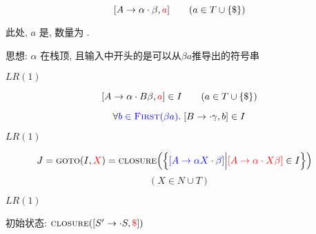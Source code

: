 \begin{frame}{}
  \begin{center}
    \begin{definition}[$LR(1)$项 (Item)]
      \[
        [A \to \alpha \cdot \beta, \textcolor{red}{a}] \qquad (a \in T \cup \{\$\})
      \]

      此处, $a$ 是, 数量为 .
    \end{definition}

    \pause
    \vspace{0.80cm}
    思想: $\alpha$ 在栈顶, 且输入中开头的是可以从$\beta a$推导出的符号串
  \end{center}
\end{frame}

\begin{frame}{}
  \begin{center}
    $LR(1)$

    \[
      [A \to \alpha \cdot B \beta, \textcolor{red}{a}] \in I \qquad (a \in T \cup \{\$\})
    \]

    \[
      \forall \textcolor{blue}{b \in \textsc{First}(\beta a)}.\; [B \to \cdot \gamma, b] \in I
    \]
  \end{center}
\end{frame}

\begin{frame}{}
  \begin{center}
    $LR(1)$

    \vspace{0.60cm}
    \begin{align*}
      J = \textsc{goto}(I, \textcolor{red}{X}) &= \textsc{closure}\Big(\Big\{
            \textcolor{blue}{[A \to \alpha X \cdot \beta]}
            \Big\lvert \textcolor{red}{[A \to \alpha \cdot X \beta]} \in I \Big\}\Big)
    \end{align*}
    \[
      (X \in N \cup T)
    \]
  \end{center}
\end{frame}

\begin{frame}{}
  \begin{center}
    $LR(1)$

    \vspace{0.60cm}

    \vspace{0.60cm}
    初始状态: $\textsc{closure}({[S' \to \cdot S, \textcolor{red}{\$}]})$
  \end{center}
\end{frame}

